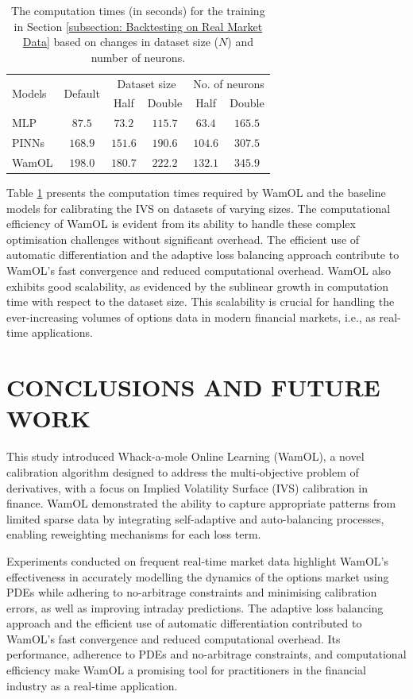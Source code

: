 \documentclass[sigconf, authorversion=true, nonacm=true]{acmart}
\begin{document}
\begin{table}[H]
    \centering
    \caption{The computation times (in seconds) for the training in Section \ref{subsection: Backtesting on Real Market Data} based on changes in dataset size ($N$) and number of neurons.}
    \label{tab: computational_efficiency}
    {\small\begin{tabular}{lccccc}
    \toprule
    \multirow{2}{*}{Models} & \multirow{2}{*}{Default} & \multicolumn{2}{c}{Dataset size} & \multicolumn{2}{c}{No. of neurons}\\
    && Half & Double & Half & Double \\
    \midrule
    MLP & $87.5$ & $73.2$ & $115.7$ & $63.4$ & $165.5$\\
    PINNs & $168.9$ & $151.6$ & $190.6$ & $104.6$ & $307.5$\\
    WamOL & $198.0$ & $180.7$ & $222.2$ & $132.1$ & $345.9$\\
    \bottomrule
    \end{tabular}}
\end{table}
Table \ref{tab: computational_efficiency} presents the computation times required by WamOL and the baseline models for calibrating the IVS on datasets of varying sizes. The computational efficiency of WamOL is evident from its ability to handle these complex optimisation challenges without significant overhead. The efficient use of automatic differentiation and the adaptive loss balancing approach contribute to WamOL's fast convergence and reduced computational overhead. WamOL also exhibits good scalability, as evidenced by the sublinear growth in computation time with respect to the dataset size. This scalability is crucial for handling the ever-increasing volumes of options data in modern financial markets, i.e., as real-time applications.

\balance
\section{CONCLUSIONS AND FUTURE WORK}
This study introduced Whack-a-mole Online Learning (WamOL), a novel calibration algorithm designed to address the multi-objective problem of derivatives, with a focus on Implied Volatility Surface (IVS) calibration in finance. WamOL demonstrated the ability to capture appropriate patterns from limited sparse data by integrating self-adaptive and auto-balancing processes, enabling reweighting mechanisms for each loss term.

Experiments conducted on frequent real-time market data highlight WamOL's effectiveness in accurately modelling the dynamics of the options market using PDEs while adhering to no-arbitrage constraints and minimising calibration errors, as well as improving intraday predictions. The adaptive loss balancing approach and the efficient use of automatic differentiation contributed to WamOL's fast convergence and reduced computational overhead. Its performance, adherence to PDEs and no-arbitrage constraints, and computational efficiency make WamOL a promising tool for practitioners in the financial industry as a real-time application.
\end{document}

